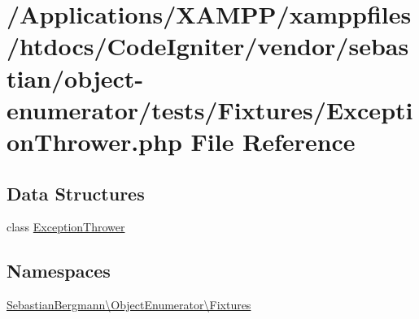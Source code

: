 \hypertarget{_exception_thrower_8php}{}\section{/\+Applications/\+X\+A\+M\+P\+P/xamppfiles/htdocs/\+Code\+Igniter/vendor/sebastian/object-\/enumerator/tests/\+Fixtures/\+Exception\+Thrower.php File Reference}
\label{_exception_thrower_8php}
\subsection*{Data Structures}
\begin{DoxyCompactItemize}
\item 
class \mbox{\hyperlink{class_sebastian_bergmann_1_1_object_enumerator_1_1_fixtures_1_1_exception_thrower}{Exception\+Thrower}}
\end{DoxyCompactItemize}
\subsection*{Namespaces}
\begin{DoxyCompactItemize}
\item 
 \mbox{\hyperlink{namespace_sebastian_bergmann_1_1_object_enumerator_1_1_fixtures}{Sebastian\+Bergmann\textbackslash{}\+Object\+Enumerator\textbackslash{}\+Fixtures}}
\end{DoxyCompactItemize}
